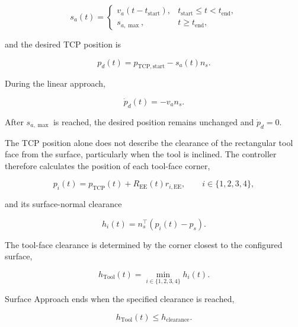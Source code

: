 \begin{equation}
s_a(t)
=
\begin{cases}
v_a\left(t-t_{\mathrm{start}}\right),
& t_{\mathrm{start}}\leq t<t_{\mathrm{end}},\\[4pt]
s_{a,\max}, & t\geq t_{\mathrm{end}},
\end{cases}
\label{eq:implementation_approach_coordinate}
\end{equation}

and the desired TCP position is

\begin{equation}
p_d(t)=p_{\mathrm{TCP,start}}-s_a(t)n_s.
\label{eq:implementation_approach_reference}
\end{equation}

During the linear approach,

\[
\dot p_d(t)=-v_an_s.
\]

After \mbox{\(s_{a,\max}\)} is reached, the desired position remains unchanged
and \mbox{\(\dot p_d=0\)}.

The TCP position alone does not describe the clearance of the rectangular tool
face from the surface, particularly when the tool is inclined. The controller
therefore calculates the position of each tool-face corner,

\begin{equation}
p_i(t)
=
p_{\mathrm{TCP}}(t)+R_{\mathrm{EE}}(t)r_{i,\mathrm{EE}},
\qquad
i\in\{1,2,3,4\},
\label{eq:implementation_corner_position}
\end{equation}

and its surface-normal clearance

\begin{equation}
h_i(t)
=
n_s^\top\left(p_i(t)-p_s\right).
\label{eq:implementation_corner_clearance}
\end{equation}

The tool-face clearance is determined by the corner closest to the configured
surface,

\begin{equation}
h_{\mathrm{Tool}}(t)
=
\min_{i\in\{1,2,3,4\}}h_i(t).
\label{eq:implementation_tool_clearance}
\end{equation}

Surface Approach ends when the specified clearance is reached,

\begin{equation}
h_{\mathrm{Tool}}(t)\leq h_{\mathrm{clearance}}.
\label{eq:implementation_clearance_transition}
\end{equation}

